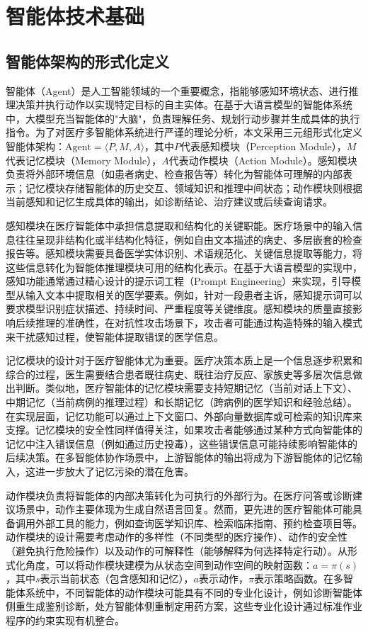 \section{智能体技术基础}
\label{sec:agent_basis}

\subsection{智能体架构的形式化定义}
\label{subsec:agent_arch}

智能体（Agent）是人工智能领域的一个重要概念，指能够感知环境状态、进行推理决策并执行动作以实现特定目标的自主实体\cite{wang2023agent,xi2023agents}。在基于大语言模型的智能体系统中，大模型充当智能体的"大脑"，负责理解任务、规划行动步骤并生成具体的执行指令。为了对医疗多智能体系统进行严谨的理论分析，本文采用三元组形式化定义智能体架构：$\text{Agent} = \langle P, M, A \rangle$，其中$P$代表感知模块（Perception Module），$M$代表记忆模块（Memory Module），$A$代表动作模块（Action Module）。感知模块负责将外部环境信息（如患者病史、检查报告等）转化为智能体可理解的内部表示；记忆模块存储智能体的历史交互、领域知识和推理中间状态；动作模块则根据当前感知和记忆生成具体的输出，如诊断结论、治疗建议或后续查询请求。

感知模块在医疗智能体中承担信息提取和结构化的关键职能。医疗场景中的输入信息往往呈现非结构化或半结构化特征，例如自由文本描述的病史、多层嵌套的检查报告等。感知模块需要具备医学实体识别、术语规范化、关键信息提取等能力，将这些信息转化为智能体推理模块可用的结构化表示。在基于大语言模型的实现中，感知功能通常通过精心设计的提示词工程（Prompt Engineering）来实现，引导模型从输入文本中提取相关的医学要素。例如，针对一段患者主诉，感知提示词可以要求模型识别症状描述、持续时间、严重程度等关键维度。感知模块的质量直接影响后续推理的准确性，在对抗性攻击场景下，攻击者可能通过构造特殊的输入模式来干扰感知过程，使智能体提取错误的医学信息。

记忆模块的设计对于医疗智能体尤为重要。医疗决策本质上是一个信息逐步积累和综合的过程，医生需要结合患者既往病史、既往治疗反应、家族史等多层次信息做出判断。类似地，医疗智能体的记忆模块需要支持短期记忆（当前对话上下文）、中期记忆（当前病例的推理过程）和长期记忆（跨病例的医学知识和经验总结）。在实现层面，记忆功能可以通过上下文窗口、外部向量数据库或可检索的知识库来支撑。记忆模块的安全性同样值得关注，如果攻击者能够通过某种方式向智能体的记忆中注入错误信息（例如通过历史投毒），这些错误信息可能持续影响智能体的后续决策。在多智能体协作场景中，上游智能体的输出将成为下游智能体的记忆输入，这进一步放大了记忆污染的潜在危害。

动作模块负责将智能体的内部决策转化为可执行的外部行为。在医疗问答或诊断建议场景中，动作主要体现为生成自然语言回复。然而，更先进的医疗智能体可能具备调用外部工具的能力，例如查询医学知识库、检索临床指南、预约检查项目等。动作模块的设计需要考虑动作的多样性（不同类型的医疗操作）、动作的安全性（避免执行危险操作）以及动作的可解释性（能够解释为何选择特定行动）。从形式化角度，可以将动作模块建模为从状态空间到动作空间的映射函数：$a = \pi(s)$，其中$s$表示当前状态（包含感知和记忆），$a$表示动作，$\pi$表示策略函数。在多智能体系统中，不同智能体的动作模块可能具有不同的专业化设计，例如诊断智能体侧重生成鉴别诊断，处方智能体侧重制定用药方案，这些专业化设计通过标准作业程序的约束实现有机整合\cite{yao2022react,qian2023chatdev}。


